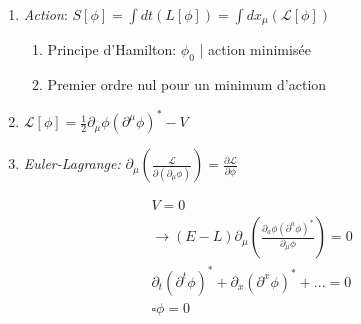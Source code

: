 \documentclass[handout]{beamer}
\begin{document}
\begin{frame}
\begin{enumerate}
\item \textit{Action}: $S[\phi] = \int{dt (L[\phi])}  =  \int{dx_\mu (\mathcal{L}[\phi])}$
\begin{enumerate}
\item Principe d'Hamilton: $\phi_0$ | action minimisée \\
\item Premier ordre nul pour un minimum d'action \\
\end{enumerate}
\item  $\mathcal{L}[\phi] = \frac{1}{2} \partial_\mu \phi (\partial^\mu \phi)^* -V$
\item \textit{Euler-Lagrange:} $\partial_\mu \left(\frac{\mathcal{L}}{\partial(\partial_\mu\phi)}\right) = \frac{\partial\mathcal{L}}{\partial\phi}$
\end{enumerate}
\begin{align*}
 V=0 \\
 \rightarrow (E-L)  \partial_\mu(\frac{\partial_a\phi (\partial^a\phi)^* }{\partial_\mu \phi}) = 0 \\
 \partial_t(\partial^{t} \phi )^{*} + \partial_x(\partial^{x} \phi )^{*} +... = 0 \\
 \square \phi = 0 \\
\end{align*}
\end{frame}
\end{document}
